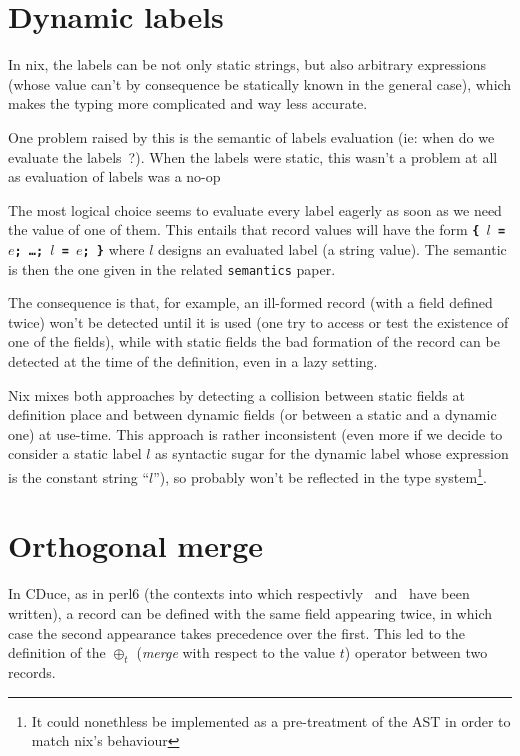 \documentclass{article}
\newcommand{\Γ}{\Gamma}
\newcommand{\τ}{\tau}
\newcommand{\σ}{\sigma}
\begin{document}
\section{Dynamic labels}

In nix, the labels can be not only static strings, but also arbitrary
expressions (whose value can't by consequence be statically known in the
general case), which makes the typing more complicated and way less accurate.

One problem raised by this is the semantic of labels evaluation (ie: when do we
evaluate the labels ?). When the labels were static, this wasn't a problem at
all as evaluation of labels was a no-op

The most logical choice seems to evaluate every label eagerly as soon as we
need the value of one of them. This entails that record values will have the
form \texttt{\bfseries \{ $l$ = $e$; \ldots{}; $l$ = $e$; \}} where $l$ designs
an evaluated label (a string value). The semantic is then the one given in the
related \texttt{semantics} paper.

The consequence is that, for example, an ill-formed record (with a field
defined twice) won't be detected until it is used (one try to access or test
the existence of one of the fields), while with static fields the bad formation
of the record can be detected at the time of the definition, even in a lazy
setting.

Nix mixes both approaches by detecting a collision between static fields at
definition place and between dynamic fields (or between a static and a dynamic
one) at use-time. This approach is rather inconsistent (even more if we decide
to consider a static label $l$ as syntactic sugar for the dynamic label whose
expression is the constant string ``$l$''), so probably won't be reflected in
the type system\footnote{It could nonethless be implemented as a pre-treatment
of the AST in order to match nix's behaviour}.

\section{Orthogonal merge}

In CDuce, as in perl6 (the contexts into which respectivly~\cite{Fri04}
and~\cite{Cas15} have been written), a record can be defined with the same field
appearing twice, in which case the second appearance takes precedence over the
first. This led to the definition of the $\oplus_t$ (\emph{merge} with
respect to the value $t$) operator between two records.
\end{document}
